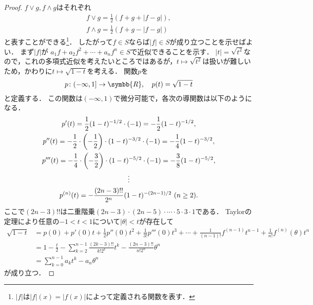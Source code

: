 \documentclass[../main.tex]{subfiles}
\begin{document}
\begin{proof} \(f \lor g, f \land g\)はそれぞれ
\begin{gather*}
  f \lor g = \frac{1}{2} (f + g + \lvert f - g \rvert), \\
  f \land g = \frac{1}{2} (f + g - \lvert f - g \rvert)
\end{gather*}
と表すことができる\footnote{%
\(\lvert f \rvert\)は\(\lvert f \rvert (x) = \lvert f(x) \rvert\)によって定義される関数を表す．}．
したがって\(f \in S\)ならば\(\lvert f \rvert \in S\)が成り立つことを示せばよい．
まず\(\lvert f \rvert\)が \(a_1 f + a_2 f^2 + \cdots + a_n f^n \in S\)で近似できることを示す．
\(\lvert t \rvert = \sqrt{t^2}\)なので，これの多項式近似を考えたいところではあるが，\(t \mapsto \sqrt{t^2}\)は扱いが難しいため，かわりに\(t \mapsto \sqrt{1 - t}\)を考える．
関数\(p\)を
\begin{align*}
  p\colon(-\infty, 1] \to \symbb{R},\quad p(t) = \sqrt{1 - t}
\end{align*}
と定義する．
この関数は\((-\infty, 1)\)で微分可能で，各次の導関数は以下のようになる．
\begin{gather*}
    p'(t) = \frac{1}{2} (1 - t)^{-1\mathbin{/}2} \cdot (-1) = -\frac{1}{2}(1 - t)^{-1\mathbin{/}2}, \\
    p''(t) = -\frac{1}{2}\cdot \left(-\frac{1}{2}\right) \cdot (1 - t)^{-3\mathbin{/}2} \cdot (-1) = - \frac{1}{4}(1 - t)^{-3\mathbin{/}2}, \\
    p'''(t) = -\frac{1}{4} \cdot \left(-\frac{3}{2}\right) \cdot (1 - t)^{-5\mathbin{/}2} \cdot (-1) = - \frac{3}{8} (1 - t)^{-5\mathbin{/}2}, \\
  \vdots \\
    p^{(n)}(t) = - \frac{(2 n - 3) !! }{2^n} (1 - t)^{- (2 n - 1)\mathbin{/}2} \ (n \geq 2).
\end{gather*}
ここで\((2n - 3)!!\)は二重階乗\((2n - 3)\cdot(2n - 5) \cdot \cdots \cdot 5 \cdot 3 \cdot 1\)である．
Taylorの定理により任意の\(-1 < t < 1\)について\(|\theta| < t\)が存在して
\begin{align*}
  \sqrt{1 - t}
  &= p(0) + p'(0) t + \frac{1}{2} p''(0) t^2 + \frac{1}{3!}p'''(0) t^3 + \cdots + \frac{1}{(n - 1)!} f^{(n - 1)} t^{n - 1} + \frac{1}{n!}f^{(n)}(\theta) t^n \\
  &= 1 - \frac{t}{2} -\sum_{k = 2}^{n - 1} \frac{(2k - 3)!!}{k!2^k} t^{k} -
  \frac{(2n - 3)!!}{n!2^n} \theta^n \\
  &= \sum_{k = 0}^{n - 1} a_k t^k - a_n \theta^n
\end{align*}
が成り立つ．

\end{proof}
\end{document}
